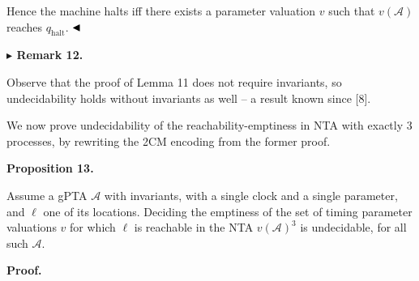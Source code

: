  
  
 
  
Hence the machine halts iff there exists a parameter valuation $v$ such that $v(\mathcal{A})$ reaches $q_{\textrm{halt}}$. $\hfill\blacktriangleleft$\par
 
 
 
\par\medskip\noindent\textbf{$\blacktriangleright$ Remark 12.}\par
 
 
Observe that the proof of Lemma 11 does not require invariants, so undecidability holds without invariants as well -- a result known since [8].\par
 
 
 
 
We now prove undecidability of the reachability-emptiness in NTA with exactly 3 processes, by rewriting the 2CM encoding from the former proof.\par
 
 
 
\par\medskip\noindent\textbf{Proposition 13.}\par
 
 
Assume a gPTA $\mathcal{A}$ with invariants, with a single clock and a single parameter, and $\mathrm{\ell}$ one of its locations. Deciding the emptiness of the set of timing parameter valuations $v$ for which $\mathrm{\ell}$ is reachable in the NTA ${v(\mathcal{A})}^{3}$ is undecidable, for all such $\mathcal{A}$.\par
 
 
 
 
 
\par\medskip\noindent\textbf{Proof.}\par
 
